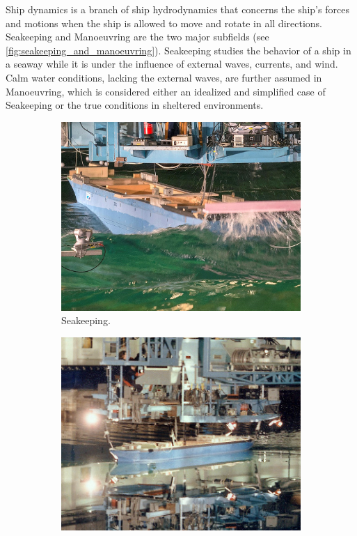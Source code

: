 Ship dynamics is a branch of ship hydrodynamics that concerns the ship's forces and motions when the ship is allowed to move and rotate in all directions. Seakeeping and Manoeuvring are the two major subfields (see \autoref{fig:seakeeping_and_manoeuvring}). Seakeeping studies the  behavior of a ship in a seaway while it is under the influence of external waves, currents, and wind. Calm water conditions, lacking the external waves, are further assumed in Manoeuvring, which is considered either an idealized and simplified case of Seakeeping or the true conditions in sheltered environments. 
\begin{figure}
    \centering
    \begin{subfigure}[b]{0.45\textwidth}
         \centering
         \includegraphics[width=\textwidth]{kappa/images/seakeeping.jpg}
         \caption{Seakeeping.}
         \label{fig:seakeeping}
     \end{subfigure}
     \hfill
     \begin{subfigure}[b]{0.45\textwidth}
         \centering
         \includegraphics[width=\textwidth]{kappa/images/manoeuvring.jpg}

\end{subfigure}
\end{figure}
